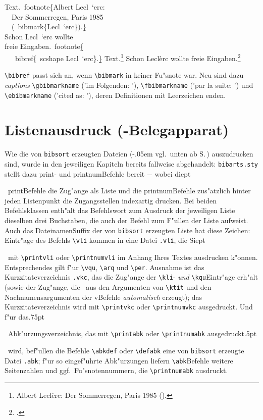 \documentclass[12pt,a4paper]{article}
\newcommand{\pdfko}[1]{\kern #1pt
                          \strut\ignorespaces}%
\newcommand{\pbs}{\string\ \unskip}
\newcommand{\bs}{\protect\pbs}
\begin{document}
\vspace{-.875ex}
\Doppelbox
{
 Text.\bs footnote\b{\{}Albert Lecl\bs\string`erc: 
        \\[.25ex] \ \ Der Sommerregen, Paris 1985 
        \\[.29ex] \ \ (\bs bibmark\{Lecl\bs\string`erc\}).\b{\}}
        \\[.47ex] Schon Lecl\bs\string`erc wollte 
        \\[.25ex] freie Eingaben.\bs footnote\b{\b{\{}}
        \\[.16ex] \ \ \bs bibref\{\bs scshape Lecl\bs\string`erc\}.\b{\b{\}}}
}
{
 Text.\footnote{Albert Lecl\`erc: Der Sommerregen, Paris 1985 ().}
        Schon Lecl\`erc wollte freie Eingaben.\footnote{
        .}
}

\vspace{-.325ex}\noindent
\verb|\bibref| passt sich an, wenn \verb|\bibmark| in 
keiner Fu"snote war. Neu sind dazu \textit{captions} 
\verb|\gbibmarkname| ('{im Folgenden: }'), 
\verb|\fbibmarkname| ('{par la suite: }')
und \verb|\ebibmarkname| ('{cited as: }'),
deren Definitionen mit Leerzeichen enden.



\newpage
\section{Listenausdruck (\BibArts-Belegapparat)}\label{Sect17}

Wie die von \verb|bibsort| erzeugten Dateien (\kern -.05em vgl.\ unten 
ab S.\,\pageref{bibsort}) auszudrucken
sind, wurde in den jeweiligen Kapiteln bereits fallweise abgehandelt:
\verb|bibarts.sty| stellt dazu print- und printnum\hy Befehle bereit $-$ wobei
die\pdfko{1.875}\ 
print\hy Befehle die Zug"ange als Liste und die printnum\hy Befehle
zus"atzlich hinter jeden Listenpunkt die Zugangsstellen indexartig drucken.
Bei beiden Befehlsklassen enth"alt das Befehlswort zum Ausdruck der
jeweiligen Liste dieselben drei Buchstaben, die auch der Befehl zum
F"ullen der Liste aufweist. Auch das Dateinamen\hy Suffix der von
\verb|bibsort| erzeugten Liste hat diese Zeichen: Eintr"age des 
\BibArts\hy Befehls \verb|\vli| kommen in eine Datei \verb|.vli|, 
die Sie\pdfko{1}\  
mit \verb|\printvli| oder \verb|\printnumvli| im Anhang 
Ihres Textes ausdrucken k"onnen. Entsprechendes gilt f"ur \verb|\vqu|, 
\verb|\arq| und \verb|\per|. Ausnahme ist das Kurzzitateverzeichnis 
\verb|.vkc|, das die Zug"ange der \verb|\kli|- \textit{und} 
\verb|\kqu|\hy Eintr"age erh"alt (sowie der Zug"ange, die \BibArts\ 
aus den Argumenten von \verb|\ktit| und den Nachnamensargumenten 
der v\fhy Befehle \textit{automatisch} erzeugt); das Kurzzitateverzeichnis
wird mit \verb|\printvkc| oder \verb|\printnumvkc| ausgedruckt. Und 
f"ur das\pdfko{.75}\ 
Abk"urzungsverzeichnis, das mit \verb|\printabk| oder 
\verb|\printnumabk| ausgedruckt\pdfko{.5}\ 
wird, bef"ullen die \BibArts\hy Befehle 
\verb|\abkdef| oder \verb|\defabk| eine von \verb|bibsort| erzeugte 
Datei \verb|.abk|; f"ur so eingef"uhrte Abk"urzungen liefern 
\verb|\abk|\hy Befehle weitere Seitenzahlen und ggf.\ Fu"snotennummern, 
die \verb|\printnumabk| ausdruckt. 
\end{document}
